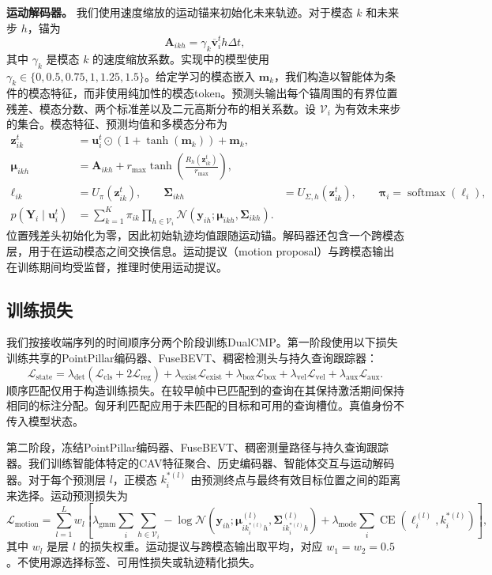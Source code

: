 \documentclass[lettersize,journal]{IEEEtran}
\begin{document}
\textbf{运动解码器。} 我们使用速度缩放的运动锚来初始化未来轨迹。对于模态 \(k\) 和未来步 \(h\)，锚为
\[
\mathbf{A}_{ikh}=\gamma_k\overline{\mathbf{v}}_i^t h\Delta t,
\tag{9}
\]
其中 \(\gamma_k\) 是模态 \(k\) 的速度缩放系数。实现中的模型使用 \(\gamma_k\in\{0,0.5,0.75,1,1.25,1.5\}\)。给定学习的模态嵌入 \(\mathbf{m}_k\)，我们构造以智能体为条件的模态特征，而非使用纯加性的模态token。预测头输出每个锚周围的有界位置残差、模态分数、两个标准差以及二元高斯分布的相关系数。设 \(\mathcal{V}_i\) 为有效未来步的集合。模态特征、预测均值和多模态分布为
\[
\begin{aligned}
\mathbf{z}_{ik}^t
&=\mathbf{u}_i^t\odot\left(1+\tanh(\mathbf{m}_k)\right)+\mathbf{m}_k,\\
\boldsymbol{\mu}_{ikh}
&=\mathbf{A}_{ikh}+r_{\max}\tanh
\left(\frac{R_h(\mathbf{z}_{ik}^t)}{r_{\max}}\right),\\
\ell_{ik}
&=U_\pi(\mathbf{z}_{ik}^t),
\qquad
\boldsymbol{\Sigma}_{ikh}
&=U_{\Sigma,h}(\mathbf{z}_{ik}^t),
\qquad
\boldsymbol{\pi}_i=\operatorname{softmax}(\boldsymbol{\ell}_i),\\
p(\mathbf{Y}_i\mid\mathbf{u}_i^t)
&=\sum_{k=1}^{K}\pi_{ik}
\prod_{h\in\mathcal{V}_i}
\mathcal{N}
\left(\mathbf{y}_{ih};
\boldsymbol{\mu}_{ikh},\boldsymbol{\Sigma}_{ikh}\right).
\end{aligned}
\tag{10}
\]
位置残差头初始化为零，因此初始轨迹均值跟随运动锚。解码器还包含一个跨模态层，用于在运动模态之间交换信息。运动提议（motion proposal）与跨模态输出在训练期间均受监督，推理时使用运动提议。

\subsection{训练损失}

我们按接收端序列的时间顺序分两个阶段训练DualCMP。第一阶段使用以下损失训练共享的PointPillar编码器、FuseBEVT、稠密检测头与持久查询跟踪器：
\[
\mathcal{L}_{\mathrm{state}}=
\lambda_{\mathrm{det}}(\mathcal{L}_{\mathrm{cls}}+2\mathcal{L}_{\mathrm{reg}})
+\lambda_{\mathrm{exist}}\mathcal{L}_{\mathrm{exist}}
+\lambda_{\mathrm{box}}\mathcal{L}_{\mathrm{box}}
+\lambda_{\mathrm{vel}}\mathcal{L}_{\mathrm{vel}}
+\lambda_{\mathrm{aux}}\mathcal{L}_{\mathrm{aux}}.
\tag{11}
\]
顺序匹配仅用于构造训练损失。在较早帧中已匹配到的查询在其保持激活期间保持相同的标注分配。匈牙利匹配应用于未匹配的目标和可用的查询槽位。真值身份不传入模型状态。

第二阶段，冻结PointPillar编码器、FuseBEVT、稠密测量路径与持久查询跟踪器。我们训练智能体特定的CAV特征聚合、历史编码器、智能体交互与运动解码器。对于每个预测层 \(l\)，正模态 \(k_i^{*(l)}\) 由预测终点与最终有效目标位置之间的距离来选择。运动预测损失为
\[
\mathcal{L}_{\mathrm{motion}}=
\sum_{l=1}^{L}w_l
\left[
\lambda_{\mathrm{gmm}}
\sum_{i}\sum_{h\in\mathcal{V}_i}
-\log\mathcal{N}
\left(
\mathbf{y}_{ih};
\boldsymbol{\mu}_{ik_i^{*(l)}h}^{(l)},
\boldsymbol{\Sigma}_{ik_i^{*(l)}h}^{(l)}
\right)
+\lambda_{\mathrm{mode}}
\sum_i\operatorname{CE}
\left(\boldsymbol{\ell}_i^{(l)},k_i^{*(l)}\right)
\right],
\tag{12}
\]
其中 \(w_l\) 是层 \(l\) 的损失权重。运动提议与跨模态输出取平均，对应 \(w_1=w_2=0.5\)。不使用源选择标签、可用性损失或轨迹精化损失。
\end{document}
